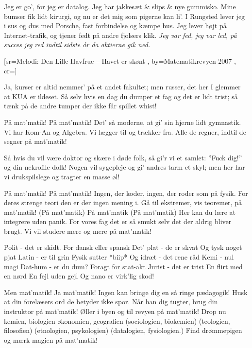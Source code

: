 \documentclass[pdftex,12pt]{article}
\begin{document}
\begin{songs}{}
\endverse
\beginverse
Jeg er go’, for jeg er datalog.
Jeg har jakkesæt \& slips \& nye gummisko.
Mine bumser fik lidt kirurgi,
og nu er det mig som pigerne kan li’.
I Rungsted lever jeg i sus og dus
med Porsche, fast forbindelse og kæmpe hus.
Jeg lever højt på Internet-trafik,
og tjener fedt på andre fjolsers klik.
\emph{Jeg var fed, jeg var led, på succes jeg red
indtil sidste år da aktierne gik ned.}

\endverse
\endsong



﻿[sr={Melodi: Den Lille Havfrue -- Havet er skønt}
,
by={Matematikrevyen 2007}
,
cr={}]\hypertarget{På mat'matik}{}
\label{song74}

\beginverse
Ja, kurser er altid nemmer’
på et andet fakultet;
men russer, det her I glemmer
at KUA er ildeset.
Så selv hvis en dag du dumper
et fag og det er lidt trist;
så tænk på de andre tumper
der ikke får spillet whist!
\endverse

\beginverse
På mat’matik! På mat’matik!
Det’ så moderne, at gi’ sin hjerne
lidt gymnastik.
Vi har Kom-An og Algebra.
Vi lægger til og trækker fra.
Alle de regner, indtil de segner
på mat’matik!
\endverse

\beginverse
Så hvis du vil være doktor
og skære i døde folk,
så gi’r vi et samlet: ”Fuck dig!”
og din nekrofile dolk!
Nogen vil sygepleje
og gi’ andres tarm et skyl;
men her har vi drukspilslege
og tragter en masse øl!
\endverse

\beginverse
På mat’matik! På mat’matik!
Ingen, der koder, ingen, der roder
som på fysik.
For deres strenge teori
den er der ingen mening i.
Gå til ekstremer, vis teoremer,
på mat’matik! (På mat’matik)
På mat’matik (På mat’matik)
Her kan du lære at integrere
uden panik.
For vores fag det er så smukt
selv det der aldrig bliver brugt.
Vi vil studere mere og mere
på mat’matik!
\endverse

\beginverse
Polit - det er skidt.
For dansk eller spansk
Det’ plat - de er skvat
Og tysk noget pjat
Latin - er til grin
Fysik sutter *biip*
Og idræt - det rene råd
Kemi - nul magi
Dat-hum - er du dum?
Foragt for stat-akt
Jurist - det er trist
En flirt med en nørd
En fejl uden gejl
Og nano er virk’lig skod!
\endverse

\beginverse
Men mat’matik! Ja mat’matik!
Ingen kan bringe dig en så ringe
pædagogik!
Husk at din forelæsers ord
de betyder ikke spor.
Når han dig tugter, brug din instruktor
på mat’matik!
Øller i byen og til revyen
på mat’matik!
Drop nu kemien, biologien
økonomien, geografien
(sociologien, biokemien)
(teologien, filosofien)
(etnologien, psykologien)
(datalogien, fysiologien.)
Find drømmepigen
og mærk magien
på mat’matik!
\endverse
\endsong




\end{songs}
\end{document}
